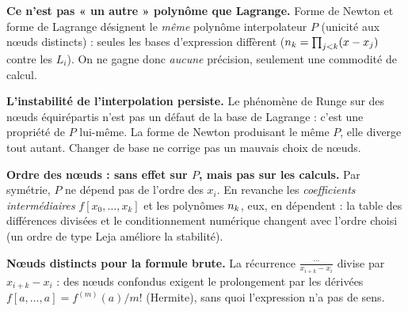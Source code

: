 \begin{mdframed}[style=cexbar]
  \textbf{Ce n'est pas « un autre » polynôme que Lagrange.}\enspace
  Forme de Newton et forme de Lagrange désignent le \emph{même} polynôme
  interpolateur $P$ (unicité aux nœuds distincts) : seules les bases
  d'expression diffèrent ($n_{k}=\prod_{j<k}(x-x_j)$ contre les
  $L_i$). On ne gagne donc \emph{aucune} précision, seulement une commodité
  de calcul.

  \smallskip\noindent
  \textbf{L'instabilité de l'interpolation persiste.}\enspace%
  Le phénomène de Runge sur des nœuds équirépartis n'est pas un défaut de
  la base de Lagrange : c'est une propriété de $P$ lui-même. La forme de
  Newton produisant le même $P$, elle diverge tout autant. Changer de base
  ne corrige pas un mauvais choix de nœuds.

  \smallskip\noindent
  \textbf{Ordre des nœuds : sans effet sur $P$, mais pas sur les calculs.}\enspace
  Par symétrie, $P$ ne dépend pas de l'ordre des $x_i$. En revanche les
  \emph{coefficients intermédiaires} $f[x_0,\ldots,x_k]$ et les polynômes
  $n_{k}$, eux, en dépendent : la table des différences divisées et le
  conditionnement numérique changent avec l'ordre choisi (un ordre de type
  Leja améliore la stabilité).

  \smallskip\noindent
  \textbf{Nœuds distincts pour la formule brute.}\enspace
  La récurrence $\tfrac{\cdots}{x_{i+k}-x_i}$ divise par $x_{i+k}-x_i$ :
  des nœuds confondus exigent le prolongement par les dérivées
  $f[a,\ldots,a]=f^{(m)}(a)/m!$ (Hermite), sans quoi l'expression n'a pas
  de sens.
\end{mdframed}

\vspace{6pt}
\exolabel

